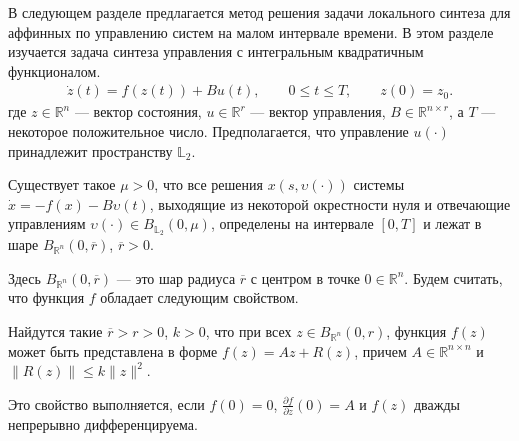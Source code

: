 \documentclass[../abstract.tex]{subfiles}
\begin{document}
В следующем разделе предлагается метод решения задачи локального синтеза для аффинных по управлению систем на малом интервале времени. 
В этом разделе изучается задача синтеза управления с интегральным квадратичным функционалом. 
\begin{gather}\label{s22:nonlinear}
	\dot{z}(t)=f(z(t))+B u(t),\qquad 0 \leqslant t \leqslant T, \qquad z(0) = z_0.
\end{gather}
где $ z \in \mathbb{R}^n $ --- вектор состояния, $ u \in \mathbb{R}^r $ --- вектор управления, $B \in \mathbb{R}^{n \times r}$, а $ 
T$ --- некоторое положительное число. 
Предполагается, что управление $u(\cdot)$ принадлежит пространству $\mathbb{L}_2 $.
\begin{assumption}\label{s22:as:solution_bounded}
	Существует такое $\mu > 0$, что все решения $x(s, \upsilon(\cdot))$ системы $\dot{x} = -f(x)-B\upsilon(t)$, выходящие из некоторой окрестности нуля и отвечающие управлениям $\upsilon(\cdot) \in B_{\mathbb{L}_2}(0, \mu)$, определены на интервале $[0, T]$ и лежат в шаре $ B_{\mathbb{R}^n}(0,\overline{r})$, $\overline{r} > 0$.
\end{assumption}
Здесь $ B_{\mathbb{R}^n}(0,\overline{r}) $ --- это шар радиуса $\overline{r}$ с центром в точке $0 \in \mathbb{R}^n$. 
Будем считать, что функция $f$ обладает следующим свойством.

\begin{assumption}\label{s22:as:Residial_term_bounds}
	Найдутся такие $\overline{r} > r >0$, $k>0$, что при всех $ z \in B_{\mathbb{R}^n}(0,r) $, функция $f(z)$ может быть представлена в форме $ f(z) = Az + R(z) $, причем $A \in \mathbb{R}^{n \times n}$ и $ \|R(z) \| \leqslant k \| z\|^2 $. 
\end{assumption}
Это свойство выполняется, если $f(0) = 0 $, $\frac{\partial f}{\partial z}(0) 
= A $ и $f(z)$ дважды непрерывно дифференцируема. 
\end{document}
